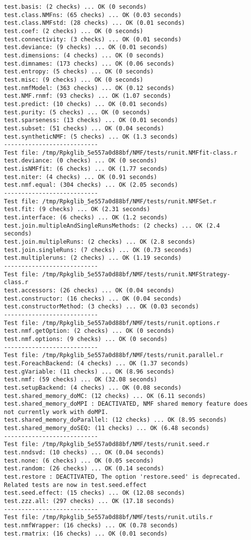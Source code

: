 \documentclass[10pt]{article}
\begin{document}
\begin{verbatim}
test.basis: (2 checks) ... OK (0 seconds)
test.class.NMFns: (65 checks) ... OK (0.03 seconds)
test.class.NMFstd: (28 checks) ... OK (0.01 seconds)
test.coef: (2 checks) ... OK (0 seconds)
test.connectivity: (3 checks) ... OK (0.01 seconds)
test.deviance: (9 checks) ... OK (0.01 seconds)
test.dimensions: (4 checks) ... OK (0 seconds)
test.dimnames: (173 checks) ... OK (0.06 seconds)
test.entropy: (5 checks) ... OK (0 seconds)
test.misc: (9 checks) ... OK (0 seconds)
test.nmfModel: (363 checks) ... OK (0.12 seconds)
test.NMF.rnmf: (93 checks) ... OK (1.07 seconds)
test.predict: (10 checks) ... OK (0.01 seconds)
test.purity: (5 checks) ... OK (0 seconds)
test.sparseness: (13 checks) ... OK (0.01 seconds)
test.subset: (51 checks) ... OK (0.04 seconds)
test.syntheticNMF: (5 checks) ... OK (1.3 seconds)
--------------------------- 
Test file: /tmp/Rpkglib_5e557a0d88bf/NMF/tests/runit.NMFfit-class.r 
test.deviance: (0 checks) ... OK (0 seconds)
test.isNMFfit: (6 checks) ... OK (1.77 seconds)
test.niter: (4 checks) ... OK (0.91 seconds)
test.nmf.equal: (304 checks) ... OK (2.05 seconds)
--------------------------- 
Test file: /tmp/Rpkglib_5e557a0d88bf/NMF/tests/runit.NMFSet.r 
test.fit: (9 checks) ... OK (2.31 seconds)
test.interface: (6 checks) ... OK (1.2 seconds)
test.join.multipleAndSingleRunsMethods: (2 checks) ... OK (2.4 seconds)
test.join.multipleRuns: (2 checks) ... OK (2.8 seconds)
test.join.singleRuns: (7 checks) ... OK (0.73 seconds)
test.multipleruns: (2 checks) ... OK (1.19 seconds)
--------------------------- 
Test file: /tmp/Rpkglib_5e557a0d88bf/NMF/tests/runit.NMFStrategy-class.r 
test.accessors: (26 checks) ... OK (0.04 seconds)
test.constructor: (16 checks) ... OK (0.04 seconds)
test.constructorMethod: (3 checks) ... OK (0.03 seconds)
--------------------------- 
Test file: /tmp/Rpkglib_5e557a0d88bf/NMF/tests/runit.options.r 
test.nmf.getOption: (2 checks) ... OK (0 seconds)
test.nmf.options: (9 checks) ... OK (0 seconds)
--------------------------- 
Test file: /tmp/Rpkglib_5e557a0d88bf/NMF/tests/runit.parallel.r 
test.ForeachBackend: (4 checks) ... OK (1.37 seconds)
test.gVariable: (11 checks) ... OK (8.96 seconds)
test.nmf: (59 checks) ... OK (32.08 seconds)
test.setupBackend: (4 checks) ... OK (0.08 seconds)
test.shared_memory_doMC: (12 checks) ... OK (6.11 seconds)
test.shared_memory_doMPI : DEACTIVATED, NMF shared memory feature does not currently work with doMPI.
test.shared_memory_doParallel: (12 checks) ... OK (8.95 seconds)
test.shared_memory_doSEQ: (11 checks) ... OK (6.48 seconds)
--------------------------- 
Test file: /tmp/Rpkglib_5e557a0d88bf/NMF/tests/runit.seed.r 
test.nndsvd: (10 checks) ... OK (0.04 seconds)
test.none: (6 checks) ... OK (0.05 seconds)
test.random: (26 checks) ... OK (0.14 seconds)
test.restore : DEACTIVATED, The option 'restore.seed' is deprecated. Related tests are now in test.seed.effect
test.seed.effect: (15 checks) ... OK (12.08 seconds)
test.zzz.all: (297 checks) ... OK (17.18 seconds)
--------------------------- 
Test file: /tmp/Rpkglib_5e557a0d88bf/NMF/tests/runit.utils.r 
test.nmfWrapper: (16 checks) ... OK (0.78 seconds)
test.rmatrix: (16 checks) ... OK (0.01 seconds)


\end{verbatim}
\end{document}
